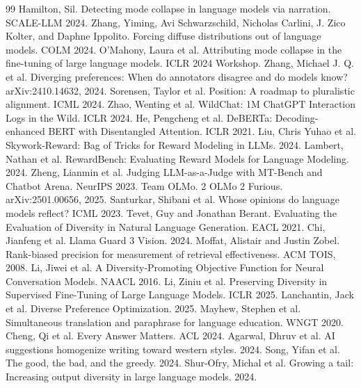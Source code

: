\begin{thebibliography}{99}
 Hamilton, Sil. Detecting mode collapse in language models via narration. SCALE-LLM 2024.
 Zhang, Yiming, Avi Schwarzschild, Nicholas Carlini, J. Zico Kolter, and Daphne Ippolito. Forcing diffuse distributions out of language models. COLM 2024.
 O'Mahony, Laura et al. Attributing mode collapse in the fine-tuning of large language models. ICLR 2024 Workshop.
 Zhang, Michael J. Q. et al. Diverging preferences: When do annotators disagree and do models know? arXiv:2410.14632, 2024.
 Sorensen, Taylor et al. Position: A roadmap to pluralistic alignment. ICML 2024.
 Zhao, Wenting et al. WildChat: 1M ChatGPT Interaction Logs in the Wild. ICLR 2024.
 He, Pengcheng et al. DeBERTa: Decoding-enhanced BERT with Disentangled Attention. ICLR 2021.
 Liu, Chris Yuhao et al. Skywork-Reward: Bag of Tricks for Reward Modeling in LLMs. 2024.
 Lambert, Nathan et al. RewardBench: Evaluating Reward Models for Language Modeling. 2024.
 Zheng, Lianmin et al. Judging LLM-as-a-Judge with MT-Bench and Chatbot Arena. NeurIPS 2023.
 Team OLMo. 2 OLMo 2 Furious. arXiv:2501.00656, 2025.
 Santurkar, Shibani et al. Whose opinions do language models reflect? ICML 2023.
 Tevet, Guy and Jonathan Berant. Evaluating the Evaluation of Diversity in Natural Language Generation. EACL 2021.
 Chi, Jianfeng et al. Llama Guard 3 Vision. 2024.
 Moffat, Alistair and Justin Zobel. Rank-biased precision for measurement of retrieval effectiveness. ACM TOIS, 2008.
 Li, Jiwei et al. A Diversity-Promoting Objective Function for Neural Conversation Models. NAACL 2016.
 Li, Ziniu et al. Preserving Diversity in Supervised Fine-Tuning of Large Language Models. ICLR 2025.
 Lanchantin, Jack et al. Diverse Preference Optimization. 2025.
 Mayhew, Stephen et al. Simultaneous translation and paraphrase for language education. WNGT 2020.
 Cheng, Qi et al. Every Answer Matters. ACL 2024.
 Agarwal, Dhruv et al. AI suggestions homogenize writing toward western styles. 2024.
 Song, Yifan et al. The good, the bad, and the greedy. 2024.
 Shur-Ofry, Michal et al. Growing a tail: Increasing output diversity in large language models. 2024.

\end{thebibliography}
